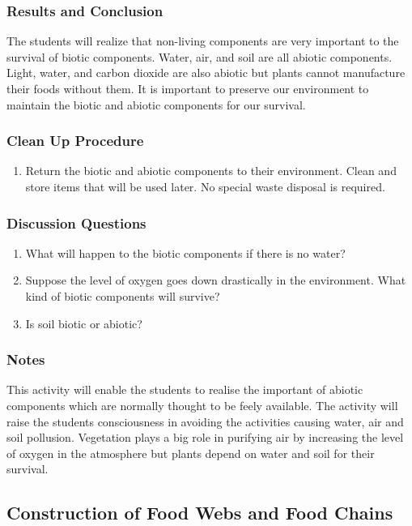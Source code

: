 \subsubsection*{Results and Conclusion}
The students will realize that non-living components are very important to the survival of biotic components. Water, air, and soil are all abiotic components. Light, water, and carbon dioxide are also abiotic but plants cannot manufacture their foods without them. It is important to preserve our environment to maintain the biotic and abiotic components for our survival.

\subsubsection*{Clean Up Procedure}
\begin{enumerate}
\item{Return the biotic and abiotic components to their environment. Clean and store items that will be used later. No special waste disposal is required.}
\end{enumerate}

\subsubsection*{Discussion Questions}
\begin{enumerate}
\item{What will happen to the biotic components if there is no water?}
\item{Suppose the level of oxygen goes down drastically in the environment. What kind of biotic components will survive?}
\item{Is soil biotic or abiotic?}
\end{enumerate}

\subsubsection*{Notes}
This activity will enable the students to realise the important of abiotic components which are normally thought to be feely available. The activity will raise the students consciousness in avoiding the activities causing water, air and soil pollusion. Vegetation plays a big role in purifying air by increasing the level of oxygen in the atmosphere but plants depend on water and soil for their survival.


\subsection{Construction of Food Webs and Food Chains}

